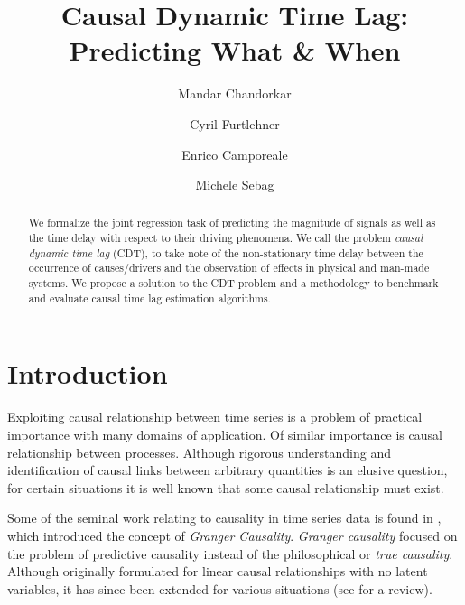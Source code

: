 \documentclass[envcountsect,runningheads]{llncs}
\theoremstyle{etoile}
\begin{document}
%
\title{Causal Dynamic Time Lag: Predicting What \& When}
%
%
\author{Mandar Chandorkar \and
Cyril Furtlehner \and
Enrico Camporeale \and 
Michele Sebag
}
%
%
%
\maketitle              %
%
\begin{abstract}
  We formalize the joint regression task of predicting the magnitude of signals as well as the 
  time delay with respect to their driving phenomena. We call the problem 
  \emph{causal dynamic time lag} (CDT), to take note of the non-stationary time delay between the 
  occurrence of causes/drivers and the observation of effects in physical and man-made systems. 
  We propose a solution to the CDT problem and a methodology to benchmark and evaluate 
  causal time lag estimation algorithms.
\end{abstract}

\section{Introduction}
Exploiting causal relationship between time series is a problem of practical importance 
with many domains of application. Of similar importance is causal relationship between processes. 
Although rigorous understanding and identification of causal links between arbitrary quantities 
is an elusive question, for certain situations it is well known that some causal relationship 
must exist. 

Some of the seminal work relating to causality in time series data is found in \cite{Granger}, 
which introduced the concept of \emph{Granger Causality}. \emph{Granger causality} focused on the 
problem of predictive causality instead of the philosophical or \emph{true causality}. Although 
originally formulated for linear causal relationships with no latent variables, it has since been 
extended for various situations (see \cite{doi:10.1002/9781119945710.ch22} for a review).
\end{document}
